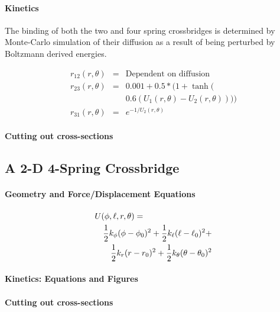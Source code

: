 \documentclass[]{article}
\begin{document}
\paragraph*{Kinetics}

The binding of both the two and four spring crossbridges is determined by Monte-Carlo simulation of their diffusion as a result of being perturbed by Boltzmann derived energies. 

\begin{eqnarray}  
\label{2sTransRates}
	r_{12}(r, \theta)   & = & \textrm{Dependent on diffusion} \nonumber \\
    r_{23}(r, \theta)   & = & 0.001 + 0.5 * (1 + \tanh( \nonumber \\
                        &   & 0.6 (U_1(r, \theta) - U_2(r, \theta)))) \\
	r_{31}(r, \theta)   & = & e^{-1 / U_2(r, \theta)}
\end{eqnarray} 

\paragraph*{Cutting out cross-sections}



\subsection*{A 2-D 4-Spring Crossbridge}


\paragraph*{Geometry and Force/Displacement Equations}


\begin{eqnarray}
	\lefteqn{U(\phi,\ell,r,\theta) = }  \nonumber \\
 	& & \frac{1}{2}k_\phi (\phi-\phi_0)^2 + \frac{1}{2}k_\ell (\ell-\ell_0)^2 + \nonumber \\
	& & \frac{1}{2}k_r (r-r_0)^2 + \frac{1}{2}k_\theta (\theta-\theta_0)^2
\end{eqnarray}

\paragraph*{Kinetics: Equations and Figures}
\paragraph*{Cutting out cross-sections}
\end{document}
